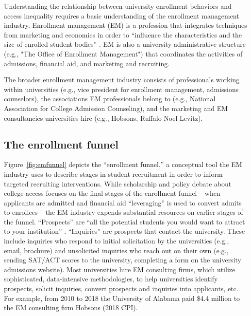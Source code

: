 \documentclass[twoside]{article}
\begin{document}
Understanding the relationship between university enrollment behaviors and access inequality requires a basic understanding of the enrollment management industry.  Enrollment management (EM) is a profession that integrates techniques from marketing and economics in order to ``influence the characteristics and the size of enrolled student bodies'' \citep[p.~xiv]{RN2771}.  EM is also a university administrative structure (e.g., "The Office of Enrollment Management") that coordinates the activities of admissions, financial aid, and marketing and recruiting.

The broader enrollment management industry consists of professionals working within universities (e.g., vice president for enrollment management, admissions counselors), the associations EM professionals belong to (e.g., National Association for College Admission Counseling), and the marketing and EM consultancies universities hire (e.g., Hobsons, Ruffalo Noel Levitz).

\subsection*{The enrollment funnel}


Figure~\ref{fig:emfunnel} depicts the ``enrollment funnel,'' a conceptual tool the EM industry uses to describe stages in student recruitment in order to inform targeted recruiting interventions.  While scholarship and policy debate about college access focuses on the final stages of the enrollment funnel -- when applicants are admitted \citep[e.g., ][]{RN3536} and financial aid ``leveraging'' is used to convert admits to enrollees \citep[e.g., ][]{RN1948} -- the EM industry expends substantial resources on earlier stages of the funnel.  ``Prospects'' are ``all the potential students you would want to attract to your institution'' \citep{RN4322}. ``Inquiries'' are prospects that contact the university. These include inquiries who respond to initial solicitation by the universities (e.g., email, brochure) and unsolicited inquiries who reach out on their own (e.g., sending SAT/ACT scores to the university, completing a form on the university admissions website).  Most universities hire EM consulting firms, which utilize sophisticated, data-intensive methodologies, to help universities identify prospects, solicit inquiries, convert prospects and inquiries into applicants, etc. For example, from 2010 to 2018 the University of Alabama paid \$4.4 million to the EM consulting firm Hobsons \citep{RN4035} (2018 CPI).
\end{document}
